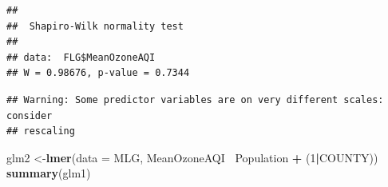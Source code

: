 \documentclass[12pt,]{article}
\newenvironment{Shaded}{\begin{snugshade}}{\end{snugshade}}
\newcommand{\KeywordTok}[1]{\textcolor[rgb]{0.13,0.29,0.53}{\textbf{#1}}}
\newcommand{\DataTypeTok}[1]{\textcolor[rgb]{0.13,0.29,0.53}{#1}}
\newcommand{\DecValTok}[1]{\textcolor[rgb]{0.00,0.00,0.81}{#1}}
\newcommand{\StringTok}[1]{\textcolor[rgb]{0.31,0.60,0.02}{#1}}
\newcommand{\CommentTok}[1]{\textcolor[rgb]{0.56,0.35,0.01}{\textit{#1}}}
\newcommand{\OperatorTok}[1]{\textcolor[rgb]{0.81,0.36,0.00}{\textbf{#1}}}
\newcommand{\NormalTok}[1]{#1}
\begin{document}
\begin{verbatim}
## 
##  Shapiro-Wilk normality test
## 
## data:  FLG$MeanOzoneAQI
## W = 0.98676, p-value = 0.7344
\end{verbatim}

\begin{Shaded}
\end{Shaded}

\begin{verbatim}
## Warning: Some predictor variables are on very different scales: consider
## rescaling
\end{verbatim}

\begin{Shaded}
\begin{Highlighting}[]
\NormalTok{glm2 <-}\KeywordTok{lmer}\NormalTok{(}\DataTypeTok{data =}\NormalTok{ MLG, MeanOzoneAQI }\OperatorTok{~}\NormalTok{Population }\OperatorTok{+}\StringTok{ }\NormalTok{(}\DecValTok{1}\OperatorTok{|}\NormalTok{COUNTY))}
\KeywordTok{summary}\NormalTok{(glm1)}
\end{Highlighting}
\end{Shaded}
\end{document}
